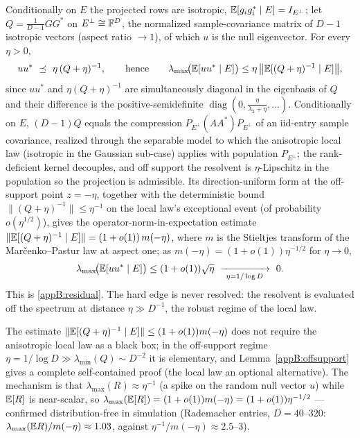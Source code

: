 \begin{proposition}\label{appB:resolvent}
Conditionally on $E$ the projected rows are isotropic, $\mathbb{E}[g_ig_i^*\mid E]=I_{E^\perp}$; let
$Q=\tfrac{1}{D-1}GG^*$ on $E^\perp\cong\mathbb{F}^D$, the normalized sample-covariance matrix of $D-1$ isotropic
vectors (aspect ratio $\to1$), of which $u$ is the null eigenvector.  For every $\eta>0$,
\[
  uu^*\ \preceq\ \eta\,(Q+\eta)^{-1},\qquad\text{hence}\qquad
  \lambda_{\max}\!\big(\EE[uu^*\mid E]\big)\le \eta\,\big\|\EE[(Q+\eta)^{-1}\mid E]\big\| ,
\]
since $uu^*$ and $\eta(Q+\eta)^{-1}$ are simultaneously diagonal in the eigenbasis of $Q$ and their
difference is the positive-semidefinite $\operatorname{diag}(0,\tfrac{\eta}{\lambda_2+\eta},\dots)$.
Conditionally on $E$, $(D-1)Q$ equals the compression $P_{E^\perp}(AA^*)P_{E^\perp}$ of an iid-entry sample
covariance, realized through the separable model to which the anisotropic local law
\cite{KnowlesYin2017} (isotropic \cite{BEKYY2014} in the Gaussian sub-case) applies with population
$P_{E^\perp}$; the rank-deficient kernel decouples, and off support the resolvent is $\eta$-Lipschitz in
the population so the projection is admissible.  Its direction-uniform form at the off-support point
$z=-\eta$, together with the deterministic bound $\|(Q+\eta)^{-1}\|\le\eta^{-1}$ on the local law's
exceptional event (of probability $o(\eta^{1/2})$), gives the operator-norm-in-expectation estimate
$\|\mathbb{E}[(Q+\eta)^{-1}\mid E]\|=(1+o(1))\,m(-\eta)$, where $m$ is the Stieltjes transform of the
Mar\v{c}enko--Pastur law at aspect one; as $m(-\eta)=(1+o(1))\eta^{-1/2}$ for $\eta\to0$,
\[
  \lambda_{\max}\!\big(\mathbb{E}[uu^*\mid E]\big)\le(1+o(1))\sqrt\eta\ \xrightarrow[\ \eta=1/\log D\ ]{}\ 0 .
\]
This is \eqref{appB:residual}.  The hard edge is never resolved: the resolvent is evaluated off the
spectrum at distance $\eta\gg D^{-1}$, the robust regime of the local law.
\end{proposition}

\begin{remark}\label{appB:selfcontained}
The estimate $\|\mathbb{E}[(Q+\eta)^{-1}\mid E]\|\le(1+o(1))m(-\eta)$ does not require the anisotropic local
law as a black box; in the off-support regime $\eta=1/\log D\gg\lambda_{\min}(Q)\sim D^{-2}$ it is
elementary, and Lemma~\ref{appB:offsupport} gives a complete self-contained proof (the local law an
optional alternative).  The mechanism is that $\lambda_{\max}(R)\approx\eta^{-1}$ (a spike on the
random null vector $u$) while $\mathbb{E}[R]$ is near-scalar, so
$\lambda_{\max}(\mathbb{E}[R])=(1+o(1))m(-\eta)=(1+o(1))\eta^{-1/2}$ --- confirmed distribution-free in
simulation (Rademacher entries, $D=40$--$320$: $\lambda_{\max}(\mathbb{E} R)/m(-\eta)\approx1.03$, against
$\eta^{-1}/m(-\eta)\approx2.5$--$3$).
\end{remark}

